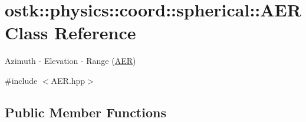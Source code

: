 \hypertarget{classostk_1_1physics_1_1coord_1_1spherical_1_1_a_e_r}{}\section{ostk\+:\+:physics\+:\+:coord\+:\+:spherical\+:\+:A\+ER Class Reference}
\label{classostk_1_1physics_1_1coord_1_1spherical_1_1_a_e_r}


Azimuth -\/ Elevation -\/ Range (\hyperlink{classostk_1_1physics_1_1coord_1_1spherical_1_1_a_e_r}{A\+ER})  




{\ttfamily \#include $<$A\+E\+R.\+hpp$>$}

\subsection*{Public Member Functions}
